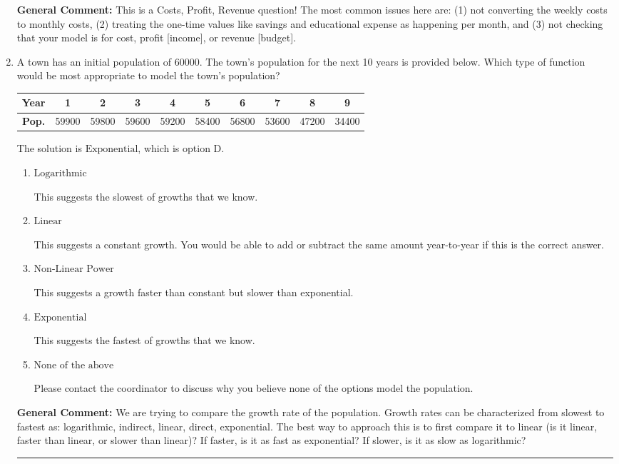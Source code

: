 \documentclass{extbook}[14pt]
\newcommand{\litem}[1]{\item #1

\rule{\textwidth}{0.4pt}}
\begin{document}
\begin{enumerate}
{\textbf{General Comment:} This is a Costs, Profit, Revenue question! The most common issues here are: (1) not converting the weekly costs to monthly costs, (2) treating the one-time values like savings and educational expense as happening per month, and (3) not checking that your model is for cost, profit [income], or revenue [budget].
}
\litem{
A town has an initial population of 60000. The town's population for the next 10 years is provided below. Which type of function would be most appropriate to model the town's population?



\begin{tabular}{c|c|c|c|c|c|c|c|c|c}
\textbf{Year} & 1 & 2 & 3 & 4 & 5 & 6 & 7 & 8 & 9 \tabularnewline
\hline
\textbf{Pop.} & 59900 & 59800 & 59600 & 59200 & 58400 & 56800 & 53600 & 47200 & 34400
\end{tabular} 

The solution is \( \text{Exponential} \), which is option D.\begin{enumerate}[label=\Alph*.]
\item \( \text{Logarithmic} \)

This suggests the slowest of growths that we know.
\item \( \text{Linear} \)

This suggests a constant growth. You would be able to add or subtract the same amount year-to-year if this is the correct answer.
\item \( \text{Non-Linear Power} \)

This suggests a growth faster than constant but slower than exponential.
\item \( \text{Exponential} \)

This suggests the fastest of growths that we know.
\item \( \text{None of the above} \)

Please contact the coordinator to discuss why you believe none of the options model the population.
\end{enumerate}

\textbf{General Comment:} We are trying to compare the growth rate of the population. Growth rates can be characterized from slowest to fastest as: logarithmic, indirect, linear, direct, exponential. The best way to approach this is to first compare it to linear (is it linear, faster than linear, or slower than linear)? If faster, is it as fast as exponential? If slower, is it as slow as logarithmic?
}
\end{enumerate}
\end{document}
